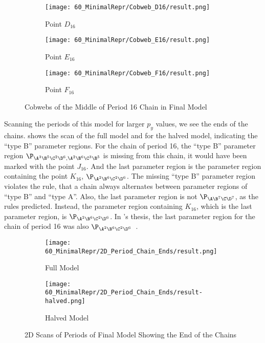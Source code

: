 \begin{figure}
    \centering
    \begin{subfigure}{0.3\textwidth}
        \centering
        \texttt{[image: 60\_MinimalRepr/Cobweb\_D16/result.png]}
        \caption{Point $D_{16}$}
        \label{fig:final.cob.D16}
    \end{subfigure}
    \begin{subfigure}{0.3\textwidth}
        \centering
        \texttt{[image: 60\_MinimalRepr/Cobweb\_E16/result.png]}
        \caption{Point $E_{16}$}
        \label{fig:final.cob.E16}
    \end{subfigure}
    \begin{subfigure}{0.3\textwidth}
        \centering
        \texttt{[image: 60\_MinimalRepr/Cobweb\_F16/result.png]}
        \caption{Point $F_{16}$}
        \label{fig:final.cob.F16}
    \end{subfigure}
    \caption{Cobwebs of the Middle of Period 16 Chain in Final Model}
    \label{fig:final.cob.mid16}
\end{figure}

Scanning the periods of this model for larger $p_y$ values, we see the ends of the chains.
 shows the scan of the full model and  for the halved model, indicating the ``type B'' parameter regions.
For the chain of period 16, the ``type B'' parameter region $\P_{\A^3\B^5\C^2\D^6, \A^2\B^6\C^3\B^5}$ is missing from this chain, it would have been marked with the point $J_{16}$.
And the last parameter region is the parameter region containing the point $K_{16}$, $\P_{\A^2\B^6\C^2\D^6}$.
The missing ``type B'' parameter region violates the rule, that a chain always alternates between parameter regions of ``type B'' and ``type A''.
Also, the last parameter region is not $\P_{\A\B^7\C\D^7}$, as the rules predicted.
Instead, the parameter region containing $K_{16}$, which is the last parameter region, is $\P_{\A^2\B^6\C^2\D^6}$.
In 's thesis, the last parameter region for the chain of period 16 was also $\P_{\A^2\B^6\C^2\D^6}$~\Cite{akyuz2022}.

\begin{figure}
    \centering
    \begin{subfigure}{0.4\textwidth}
        \centering
        \texttt{[image: 60\_MinimalRepr/2D\_Period\_Chain\_Ends/result.png]}
        \caption{Full Model}
        \label{fig:final.period.end.full}
    \end{subfigure}
    \begin{subfigure}{0.4\textwidth}
        \centering
        \texttt{[image: 60\_MinimalRepr/2D\_Period\_Chain\_Ends/result-halved.png]}
        \caption{Halved Model}
        \label{fig:final.period.end.halved}
    \end{subfigure}
    \caption{2D Scans of Periods of Final Model Showing the End of the Chains}
\end{figure}

